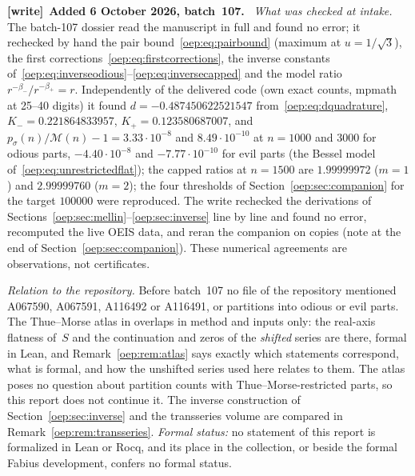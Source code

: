 \documentclass[11pt,letterpaper]{article}
\theoremstyle{remark}\newtheorem{remark}[theorem]{Remark}
\newcommand{\calM}{\mathcal M}
\newenvironment{writenote}[1][]{\par\smallskip\begingroup\small
 \noindent\textbf{[write]}\if\relax\detokenize{#1}\relax\else~\textbf{#1.}\fi\ }%
 {\par\endgroup\smallskip}
\begin{document}
\begin{writenote}[Added 6 October 2026, batch~107]
\emph{What was checked at intake.} The batch-107 dossier read the manuscript
in full and found no error; it rechecked by hand the pair
bound~\eqref{oep:eq:pairbound} (maximum at $u=1/\sqrt3$), the first
corrections~\eqref{oep:eq:firstcorrections}, the inverse constants
of~\eqref{oep:eq:inverseodious}--\eqref{oep:eq:inversecapped} and the model
ratio $r^{-\beta_-}/r^{-\beta_+}=r$. Independently of the delivered code
(own exact counts, mpmath at 25--40 digits) it found $d=-0.487450622521547$
from~\eqref{oep:eq:dquadrature}, $K_-=0.221864833957$,
$K_+=0.123580687007$, and $p_\sigma(n)/\calM(n)-1=3.33\cdot10^{-8}$ and
$8.49\cdot10^{-10}$ at $n=1000$ and $3000$ for odious parts,
$-4.40\cdot10^{-8}$ and $-7.77\cdot10^{-10}$ for evil parts (the Bessel
model of~\eqref{oep:eq:unrestrictedflat}); the capped ratios at $n=1500$
are $1.99999972$ ($m=1$) and $2.99999760$ ($m=2$); the four thresholds of
Section~\ref{oep:sec:companion} for the target $100000$ were reproduced. The
write rechecked the derivations of
Sections~\ref{oep:sec:mellin}--\ref{oep:sec:inverse} line by line and found
no error, recomputed the live OEIS data, and reran the
companion on copies (note at the end of Section~\ref{oep:sec:companion}).
These numerical agreements are observations, not certificates.

\emph{Relation to the repository.} Before batch~107 no file of the
repository mentioned A067590, A067591, A116492 or A116491, or partitions into
odious or evil parts. The Thue--Morse atlas in
 overlaps in method and inputs only: the
real-axis flatness of~$S$ and the continuation and zeros of the
\emph{shifted} series are there, formal in Lean, and
Remark~\ref{oep:rem:atlas} says exactly which statements correspond, what
is formal, and how the unshifted series used here relates to them. The
atlas poses no question about partition counts with Thue--Morse-restricted
parts, so this report does not continue it. The inverse construction of
Section~\ref{oep:sec:inverse} and the transseries volume are compared in
Remark~\ref{oep:rem:transseries}. \emph{Formal status:} no statement of this
report is formalized in Lean or Rocq, and its place in the collection, or
beside the formal Fabius development, confers no formal status.
\end{writenote}
\end{document}
